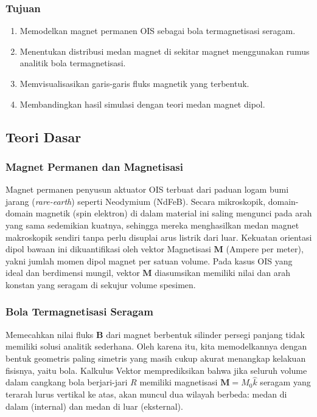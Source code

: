 \documentclass[11pt,a4paper]{article}
\begin{document}
\subsubsection{Tujuan}
\begin{enumerate}[itemsep=1pt,topsep=2pt]
\item Memodelkan magnet permanen OIS sebagai bola termagnetisasi seragam.
\item Menentukan distribusi medan magnet di sekitar magnet menggunakan rumus analitik bola termagnetisasi.
\item Memvisualisasikan garis-garis fluks magnetik yang terbentuk.
\item Membandingkan hasil simulasi dengan teori medan magnet dipol.
\end{enumerate}

\subsection{Teori Dasar}

\subsubsection{Magnet Permanen dan Magnetisasi}
Magnet permanen penyusun aktuator OIS terbuat dari paduan logam bumi jarang (\textit{rare-earth}) seperti Neodymium (NdFeB). Secara mikroskopik, domain-domain magnetik (spin elektron) di dalam material ini saling mengunci pada arah yang sama sedemikian kuatnya, sehingga mereka menghasilkan medan magnet makroskopik sendiri tanpa perlu disuplai arus listrik dari luar. Kekuatan orientasi dipol bawaan ini dikuantifikasi oleh vektor Magnetisasi $\mathbf{M}$ (Ampere per meter), yakni jumlah momen dipol magnet per satuan volume. Pada kasus OIS yang ideal dan berdimensi mungil, vektor $\mathbf{M}$ diasumsikan memiliki nilai dan arah konstan yang seragam di sekujur volume spesimen.

\subsubsection{Bola Termagnetisasi Seragam}
Memecahkan nilai fluks $\mathbf{B}$ dari magnet berbentuk silinder persegi panjang tidak memiliki solusi analitik sederhana. Oleh karena itu, kita memodelkannya dengan bentuk geometris paling simetris yang masih cukup akurat menangkap kelakuan fisisnya, yaitu bola. Kalkulus Vektor memprediksikan bahwa jika seluruh volume dalam cangkang bola berjari-jari $R$ memiliki magnetisasi $\mathbf{M} = M_0 \hat{k}$ seragam yang terarah lurus vertikal ke atas, akan muncul dua wilayah berbeda: medan di dalam (internal) dan medan di luar (eksternal).
\end{document}
